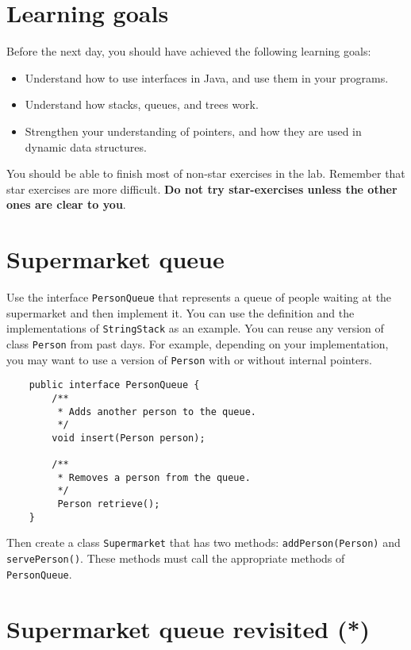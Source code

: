 \documentclass{article}
\begin{document}
\section*{Learning goals}
\label{sec:learning-goals}

Before the next day, you should have achieved the following learning
goals: 

\begin{itemize}
\item Understand how to use interfaces in Java, and use them in your
  programs. 
\item Understand how stacks, queues, and trees work. 
\item Strengthen your understanding of pointers, and how they are used
  in dynamic data structures. 
\end{itemize}

You should be able to finish most of non-star exercises in the lab. 
Remember that star exercises are more difficult. 
\textbf{Do not try star-exercises unless the other ones are clear to
  you}.  

\section{Supermarket queue}
\label{sec:queues}

Use the interface \verb+PersonQueue+ that represents a queue of
people waiting at the supermarket and then implement it. You can use
the definition and the implementations of \verb+StringStack+ as an
example. You can reuse any version of class \verb+Person+ from past
days. For example, depending on your implementation, you may want to
use a version of \verb+Person+ with or without internal pointers. 

\begin{verbatim}
    public interface PersonQueue {
        /**
         * Adds another person to the queue.
         */
        void insert(Person person);

        /**
         * Removes a person from the queue.
         */ 
         Person retrieve();
    }
\end{verbatim}

Then create a class \verb+Supermarket+ that has two methods:
\verb+addPerson(Person)+ and \verb+servePerson()+. These methods must
call the appropriate methods of \verb+PersonQueue+. 

\section{Supermarket queue revisited (*)}
\label{sec:superm-queue-revis}
\end{document}
